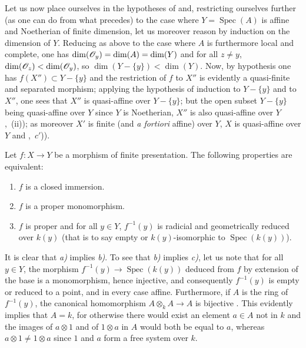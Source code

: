 Let us now place ourselves in the hypotheses of  and, restricting ourselves further (as one can do from what precedes) to the case where $Y=\operatorname{Spec}(A)$ is affine and Noetherian of finite dimension, let us moreover reason by induction on the dimension of $Y$.
Reducing as above to the case where $A$ is furthermore local and complete, one has $\dim(\mathscr{O}_y)=\dim(A)=\dim(Y)$ and for all $z\neq y$, $\dim(\mathscr{O}_z)<\dim(\mathscr{O}_y)$, so $\dim(Y-\{y\})<\dim(Y)$.
Now, by hypothesis one has $f(X'')\subset Y-\{y\}$ and the restriction of $f$ to $X''$ is evidently a quasi-finite and separated morphism; applying the hypothesis of induction to $Y-\{y\}$ and to $X''$, one sees that $X''$ is quasi-affine over $Y-\{y\}$; but the open subset $Y-\{y\}$ being quasi-affine over $Y$ since $Y$ is Noetherian, $X''$ is also quasi-affine over $Y$ ,~(ii)); as moreover $X'$ is finite (and \emph{a fortiori} affine) over $Y$, $X$ is quasi-affine over $Y$  and ,~$c'$)).

\begin{proposition}[8.11.5]
\label{IV.8.11.5}
Let $f:X\to Y$ be a morphism of finite presentation.
The following properties are equivalent:
\begin{enumerate}[label=\emph{\alph*)}]
  \item $f$ is a closed immersion.
  \item $f$ is a proper monomorphism.
  \item $f$ is proper and for all $y\in Y$, $f^{-1}(y)$ is radicial and geometrically reduced over $k(y)$ (that is to say empty or $k(y)$-isomorphic to $\operatorname{Spec}(k(y))$).
\end{enumerate}
\end{proposition}

It is clear that \emph{a)} implies \emph{b)}.
To see that \emph{b)} implies \emph{c)}, let us note  that for all $y\in Y$, the morphism $f^{-1}(y)\to\operatorname{Spec}(k(y))$ deduced from $f$ by extension of the base is a monomorphism, hence injective, and consequently $f^{-1}(y)$ is empty or reduced to a point, and in every case affine.
Furthermore, if $A$ is the ring of $f^{-1}(y)$, the canonical homomorphism $A\otimes_k A\to A$ is bijective .
This evidently implies that $A=k$, for otherwise there would exist an element $a\in A$ not in $k$ and the images of $a\otimes 1$ and of $1\otimes a$ in $A$ would both be equal to $a$, whereas $a\otimes 1\neq1\otimes a$ since $1$ and $a$ form a free system over $k$.

